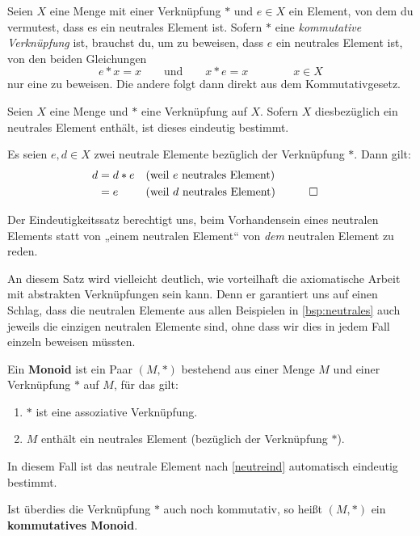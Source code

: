 \begin{bem}
    Seien $X$ eine Menge mit einer Verknüpfung $*$ und $e\in X$ ein Element, von dem du vermutest, dass es ein neutrales Element ist. Sofern $*$ eine \emph{kommutative Verknüpfung} ist, brauchst du, um zu beweisen, dass $e$ ein neutrales Element ist, von den beiden Gleichungen
        \[ e*x=x \qquad\text{und}\qquad x*e=x \qquad\qquad x\in X \]
    nur eine zu beweisen. Die andere folgt dann direkt aus dem Kommutativgesetz.
\end{bem}


\begin{satz} \label{neutreind}
    Seien $X$ eine Menge und $*$ eine Verknüpfung auf $X$. Sofern $X$ diesbezüglich ein neutrales Element enthält, ist dieses eindeutig bestimmt.
\end{satz}
 

\begin{bew}
    Es seien $e,d\in X$ zwei neutrale Elemente bezüglich der Verknüpfung $*$. Dann gilt:
    \begin{align*}
        d & = d*e && (\text{weil $e$ neutrales Element}) \\
        & = e && (\text{weil $d$ neutrales Element}) && \qed
    \end{align*}
\end{bew}


\begin{bem}
    Der Eindeutigkeitssatz berechtigt uns, beim Vorhandensein eines neutralen Elements statt von „einem neutralen Element“ von \emph{dem} neutralen Element zu reden.
    
    An diesem Satz wird vielleicht deutlich, wie vorteilhaft die axiomatische Arbeit mit abstrakten Verknüpfungen sein kann. Denn er garantiert uns auf einen Schlag, dass die neutralen Elemente aus allen Beispielen in \cref{bsp:neutrales} auch jeweils die einzigen neutralen Elemente sind, ohne dass wir dies in jedem Fall einzeln beweisen müssten.
\end{bem}


\begin{de}[Monoid] 
    Ein \textbf{Monoid} ist ein Paar $(M,*)$ bestehend aus einer Menge $M$ und einer Verknüpfung $*$ auf $M$, für das gilt:
    \begin{enumerate}[(M1), labelindent=1.5em, leftmargin=*]
        \item $*$ ist eine assoziative Verknüpfung.
        \item $M$ enthält ein neutrales Element (bezüglich der Verknüpfung $*$).
    \end{enumerate}
    In diesem Fall ist das neutrale Element nach \cref{neutreind} automatisch eindeutig bestimmt.
    
    Ist überdies die Verknüpfung $*$ auch noch kommutativ, so heißt $(M,*)$ ein \textbf{kommutatives Monoid}.
\end{de}


